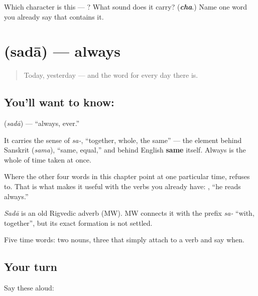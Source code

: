 \begin{tcolorbox}[breakable,colback=teal!4,colframe=teal!35!black,title={Before you move on}]
Which character is this — ? What sound does it carry? (\emph{\textbf{cha}}.) Name one word you already say that contains it.
\end{tcolorbox}
\section[\texorpdfstring{\sk{सदा} (sadā)}{सदा (sadā)}]{ (sadā) — always}

\label{lesson:SA-C17-always}



\begin{quote}
Today, yesterday — and the word for every day there is.
\end{quote}

\subsection*{You'll want to know: }
\textbf{} (\emph{sadā}) — \textquotedblleft{}always, ever.\textquotedblright{}

It carries the sense of \emph{sa-}, \textquotedblleft{}together, whole, the same\textquotedblright{} — the element behind Sanskrit \textbf{} (\emph{sama}), \textquotedblleft{}same, equal,\textquotedblright{} and behind English \textbf{same} itself. Always is the whole of time taken at once.

Where the other four words in this chapter point at one particular time,  refuses to. That is what makes it useful with the verbs you already have:  , \textquotedblleft{}he reads always.\textquotedblright{}

\begin{cousinweb}
\emph{Sadā} is an old Rigvedic adverb (MW). MW connects it with the prefix \emph{sa-} \textquotedblleft{}with, together\textquotedblright{}, but its exact formation is not settled.
\end{cousinweb}

\begin{grammarlens}[title={What you've built}]
Five time words: two nouns, three that simply attach to a verb and say when.
\end{grammarlens}

\subsection*{Your turn}
Say these aloud:

